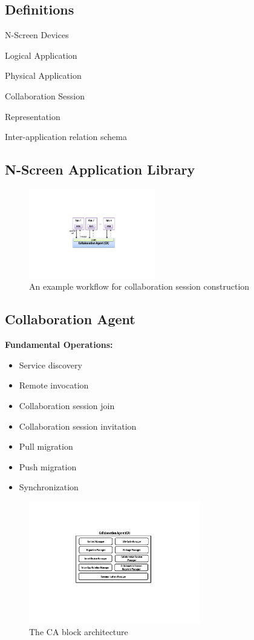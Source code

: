 \documentclass{sig-alternate}
\newcommand{\bi}{\begin{itemize}}
\newcommand{\ei}{\end{itemize}}
\newcommand{\ii}{\item}
\begin{document}
\subsection{Definitions}
N-Screen Devices

Logical Application

Physical Application

Collaboration Session

  Representation

    Inter-application relation schema

\subsection{N-Screen Application Library}
    \begin{figure}[htb] %
    \centering
    \includegraphics[width=5.5cm,keepaspectratio]{ca-api}
    \caption{An example workflow for collaboration session construction}
    \label{fig:ca-api}
    \end{figure}

\subsection{Collaboration Agent}

\noindent
\textbf{Fundamental Operations:} 
\bi
\ii Service discovery
\ii Remote invocation
\ii Collaboration session join
\ii Collaboration session invitation
\ii Pull migration
\ii Push migration
\ii Synchronization
\ei

    \begin{figure}[htb] %
    \centering
    \includegraphics[width=7.5cm,keepaspectratio]{collaborationagent}
    \caption{The CA block architecture}
    \label{fig:collaborationagent}
    \end{figure}
\end{document}
